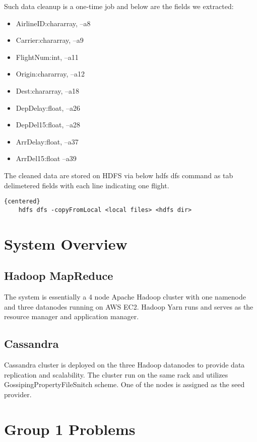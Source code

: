 \documentclass[fontsize=11pt,paper=a4,pagesize=auto]{report}
\begin{document}
\par Such data cleanup is a one-time job and below are the fields we extracted: 
\begin{itemize}
\item       AirlineID:chararray, --a8
\item       Carrier:chararray,   --a9
\item       FlightNum:int,       --a11
\item       Origin:chararray,    --a12       
\item       Dest:chararray,      --a18
\item       DepDelay:float,      --a26
\item       DepDel15:float,      --a28
\item       ArrDelay:float,      --a37 
\item       ArrDel15:float       --a39
\end{itemize}

\par The cleaned data are stored on HDFS via below hdfs dfs command  as tab delimetered fields with each line indicating one flight. 
\begin{lstlisting}{centered}
	hdfs dfs -copyFromLocal <local files> <hdfs dir>  
\end{lstlisting}
 
\section{System Overview}
\subsection{Hadoop MapReduce}
The system is essentially a 4 node Apache Hadoop cluster with one namenode and three datanodes running on AWS EC2. 
Hadoop Yarn runs and serves as the resource manager and application manager.

\subsection{Cassandra} 
Cassandra cluster is deployed on the three Hadoop datanodes to provide data replication and scalability. 
The cluster run on the same rack and utilizes GossipingPropertyFileSnitch scheme. One of the nodes is assigned as the seed provider.
 
\section{Group 1 Problems} 
\end{document}
